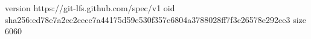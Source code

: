 version https://git-lfs.github.com/spec/v1
oid sha256:ed78e7a2ec2cece7a44175d59e530f357e6804a3788028ff7f3c26578e292ee3
size 6060
